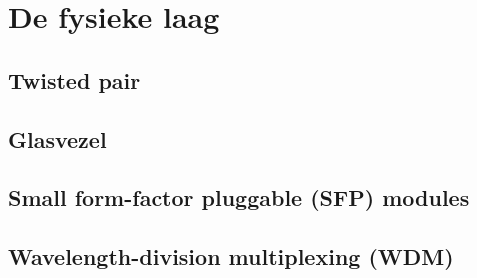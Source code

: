 \section{De fysieke laag}

\subsection{Twisted pair}

\subsection{Glasvezel}

\subsection{Small form-factor pluggable (SFP) modules}
\label{sec:sfp-modules}

\subsection{Wavelength-division multiplexing (WDM)}